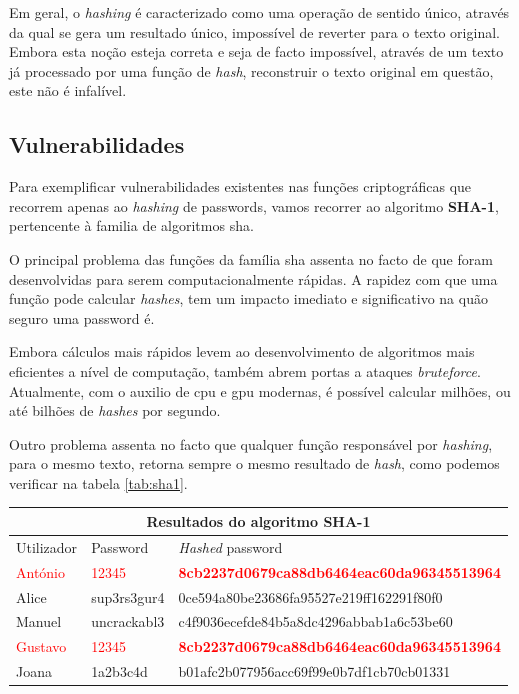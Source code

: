 Em geral, o \emph{hashing} é caracterizado como uma operação de sentido único, através da qual se gera um resultado único, impossível de reverter para o texto original.
Embora esta noção esteja correta e seja de facto impossível, através de um texto já processado por uma função de \emph{hash}, reconstruir o texto original em questão, este não é infalível.

\cleardoublepage
\subsection{Vulnerabilidades} \label{vulnerabilidades}

Para exemplificar vulnerabilidades existentes nas funções criptográficas que recorrem apenas ao \emph{hashing} de passwords, vamos recorrer ao algoritmo \textbf{SHA-1}, pertencente à familia de algoritmos \gls{sha}.

O principal problema das funções da família \gls{sha} assenta no facto de que foram desenvolvidas para serem computacionalmente rápidas. A rapidez com que uma função pode calcular \emph{hashes}, tem um impacto imediato e significativo na quão seguro uma password é.

Embora cálculos mais rápidos levem ao desenvolvimento de algoritmos mais eficientes a nível de computação, também abrem portas a ataques \emph{bruteforce}. Atualmente, com o auxilio de \gls{cpu} e \gls{gpu} modernas, é possível calcular milhões, ou até bilhões de \emph{hashes} por segundo.

Outro problema assenta no facto que qualquer função responsável por \emph{hashing}, para o mesmo texto, retorna sempre o mesmo resultado de \emph{hash}, como podemos verificar na tabela \ref{tab:sha1}.

\begin{center}
    \begin{tabular}{ |p{2cm}|p{2cm}|p{8cm}|  }
        \hline
        \multicolumn{3}{|c|}{Resultados do algoritmo SHA-1} \\
        \hline
        Utilizador & Password & \emph{Hashed} password\\
        \hline
        \textcolor{red}{António} & \textcolor{red}{12345} & \textcolor{red}{\textbf{8cb2237d0679ca88db6464eac60da96345513964}}\\
        Alice & sup3rs3gur4 & 0ce594a80be23686fa95527e219ff162291f80f0\\
        Manuel & uncrackabl3 & c4f9036ecefde84b5a8dc4296abbab1a6c53be60\\
        \textcolor{red}{Gustavo} & \textcolor{red}{12345} & \textcolor{red}{\textbf{8cb2237d0679ca88db6464eac60da96345513964}}\\
        Joana & 1a2b3c4d & b01afc2b077956acc69f99e0b7df1cb70cb01331\\
        \hline
    \end{tabular}
\label{tab:sha1} 
\end{center}

